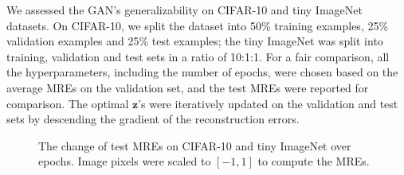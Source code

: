 \documentclass[11pt,fullpage, letterpaper,twoside]{article}
\newcommand{\1}[1]{\mathds{1}_{\left[#1\right]}}
\begin{document}
We assessed the GAN's generalizability on CIFAR-10 and tiny ImageNet datasets. On CIFAR-10, we split the dataset into 50\% training examples, 25\% validation examples and 25\% test examples; the tiny ImageNet was split into training, validation and test sets in a ratio of 10:1:1. For a fair comparison, all the hyperparameters, including the number of epochs, were chosen based on the average MREs on the validation set, and the test MREs were reported for comparison. The optimal $\mathbf z$'s were iteratively updated on the validation and test sets by descending the gradient of the reconstruction errors.




\begin{figure*}
\centering
{}
   \caption{The change of test MREs on CIFAR-10 and tiny ImageNet over epochs. Image pixels were scaled to $[-1,1]$ to compute the MREs. }\label{fig:cifar10_mre}
\end{figure*}
\end{document}
